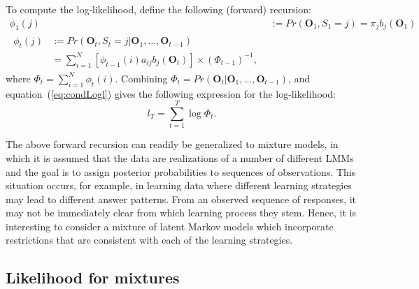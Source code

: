 \documentclass[a4paper,12pt,doc]{apaIngmar} %
\newcommand{\vc}{\mathbf}
\begin{document}
To compute the log-likelihood, \cite{Lystig2002} define the following 
(forward) recursion:
\begin{align}
	\phi_{1}(j) &:= Pr(\vc{O}_{1}, S_{1}=j) = \pi_{j}
	b_{j}(\vc{O}_{1}) \label{eq:fwd1} \\
\begin{split}
	\phi_{t}(j) &:= Pr(\vc{O}_{t}, S_{t}=j|\vc{O}_{1}, \ldots,
	\vc{O}_{t-1}) \\
	&= \sum_{i=1}^{N} [\phi_{t-1}(i)a_{ij}b_{j}(\vc{O}_{t})] \times
	(\Phi_{t-1})^{-1},
	\label{eq:fwdt} 
\end{split} 
\end{align}
where $\Phi_{t}=\sum_{i=1}^{N} \phi_{t}(i)$.  Combining
$\Phi_{t}=Pr(\vc{O}_{t}|\vc{O}_{1}, \ldots, \vc{O}_{t-1})$, and
equation~(\ref{eq:condLogl}) gives the following expression for the
log-likelihood:
\begin{equation}
	l_{T} = \sum_{t=1}^{T} \log \Phi_{t}.
\end{equation}

The above forward recursion can readily be generalized to mixture
models, in which it is assumed that the data are realizations of a
number of different LMMs and the goal is to assign posterior
probabilities to sequences of observations.  This situation occurs,
for example, in learning data where different learning strategies may
lead to different answer patterns.  From an observed sequence of
responses, it may not be immediately clear from which learning process
they stem.  Hence, it is interesting to consider a mixture of latent
Markov models which incorporate restrictions that are consistent with
each of the learning strategies.

\subsection{Likelihood for mixtures}
\end{document}

